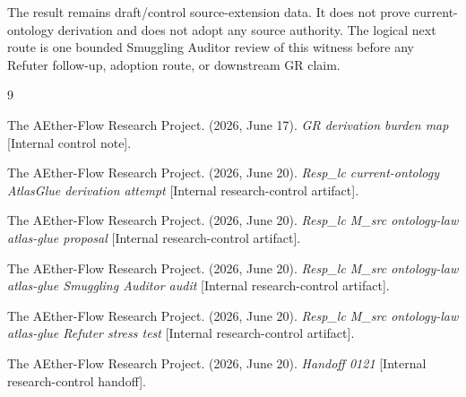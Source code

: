 \documentclass[11pt]{article}
\begin{document}
The result remains draft/control source-extension data. It does not prove
current-ontology derivation and does not adopt any source authority. The
logical next route is one bounded Smuggling Auditor review of this witness
before any Refuter follow-up, adoption route, or downstream GR claim.

\begin{thebibliography}{9}

The AEther-Flow Research Project. (2026, June 17). \emph{GR derivation burden
map} [Internal control note].

The AEther-Flow Research Project. (2026, June 20). \emph{Resp\_lc
current-ontology AtlasGlue derivation attempt} [Internal research-control
artifact].

The AEther-Flow Research Project. (2026, June 20). \emph{Resp\_lc M\_src
ontology-law atlas-glue proposal} [Internal research-control artifact].

The AEther-Flow Research Project. (2026, June 20). \emph{Resp\_lc M\_src
ontology-law atlas-glue Smuggling Auditor audit} [Internal research-control
artifact].

The AEther-Flow Research Project. (2026, June 20). \emph{Resp\_lc M\_src
ontology-law atlas-glue Refuter stress test} [Internal research-control
artifact].

The AEther-Flow Research Project. (2026, June 20). \emph{Handoff 0121}
[Internal research-control handoff].

\end{thebibliography}
\end{document}
